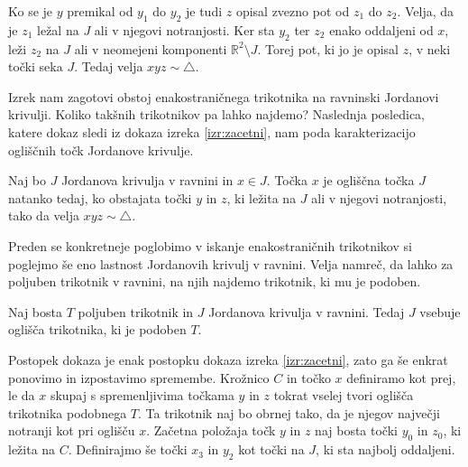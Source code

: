 \documentclass[mat1]{fmfdelo}
\newcommand{\R}{\mathbb R}
\begin{document}
Ko se je $y$ premikal od $y_1$ do $y_2$ je tudi $z$ opisal zvezno pot od $z_1$ do $z_2$. Velja, da je $z_1$ ležal na $J$ ali v njegovi notranjosti. Ker sta $y_2$ ter $z_2$ enako oddaljeni od $x$, leži $z_2$ na $J$ ali v neomejeni komponenti $\R^2 \setminus J$. Torej pot, ki jo je opisal $z$, v neki točki seka $J$. Tedaj velja $xyz \sim \triangle$.

\begin{center}
\end{center}
\endproof

Izrek nam zagotovi obstoj enakostraničnega trikotnika na ravninski Jordanovi krivulji. Koliko takšnih trikotnikov pa lahko najdemo? Naslednja posledica, katere dokaz sledi iz dokaza izreka \ref{izr:zacetni}, nam poda karakterizacijo ogliščnih točk Jordanove krivulje.
\begin{posledica}\label{posl:jordan}
Naj bo $J$ Jordanova krivulja v ravnini in $x \in J$. Točka $x$ je ogliščna točka $J$ natanko tedaj, ko obstajata točki $y$ in $z$, ki ležita na $J$ ali v njegovi notranjosti, tako da velja $xyz \sim \triangle$.
\end{posledica}

Preden se konkretneje poglobimo v iskanje enakostraničnih trikotnikov si poglejmo še eno lastnost Jordanovih krivulj v ravnini. Velja namreč, da lahko za poljuben trikotnik v ravnini, na njih najdemo trikotnik, ki mu je podoben.
\begin{trditev}
Naj bosta $T$ poljuben trikotnik in $J$ Jordanova krivulja v ravnini. Tedaj $J$ vsebuje oglišča trikotnika, ki je podoben $T$.
\end{trditev}
\proof
Postopek dokaza je enak postopku dokaza izreka \ref{izr:zacetni}, zato ga še enkrat ponovimo in izpostavimo spremembe. Krožnico $C$ in točko $x$ definiramo kot prej, le da $x$ skupaj s spremenljivima točkama $y$ in $z$ tokrat vselej tvori oglišča trikotnika podobnega $T$. Ta trikotnik naj bo obrnej tako, da je njegov največji notranji kot pri oglišču $x$. Začetna položaja točk $y$ in $z$ naj bosta točki $y_0$ in $z_0$, ki ležita na $C$. Definirajmo še točki $x_3$ in $y_2$ kot točki na $J$, ki sta najbolj oddaljeni.
\end{document}
